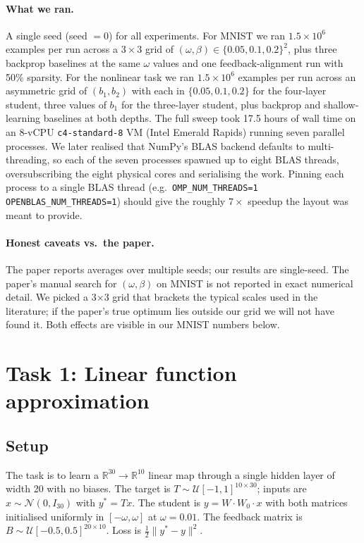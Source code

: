 \documentclass[11pt,a4paper]{article}
\begin{document}
\paragraph{What we ran.} A single seed (seed $=0$) for all experiments.
For MNIST we ran $1.5\times 10^6$ examples per run across a
$3\times 3$ grid of $(\omega,\beta) \in \{0.05, 0.1, 0.2\}^2$, plus three
backprop baselines at the same $\omega$ values and one feedback-alignment
run with 50\% sparsity. For the nonlinear task we ran $1.5\times 10^6$
examples per run across an asymmetric grid of $(b_1, b_2)$ with each in
$\{0.05, 0.1, 0.2\}$ for the four-layer student, three values of $b_1$ for
the three-layer student, plus backprop and shallow-learning baselines at
both depths. The full sweep took 17.5 hours of wall time on an 8-vCPU
\texttt{c4-standard-8} VM (Intel Emerald Rapids) running seven parallel
processes. We later realised that NumPy's BLAS backend defaults to
multi-threading, so each of the seven processes spawned up to eight BLAS
threads, oversubscribing the eight physical cores and serialising the work.
Pinning each process to a single BLAS thread (e.g.\
\texttt{OMP\_NUM\_THREADS=1 OPENBLAS\_NUM\_THREADS=1}) should give the
roughly $7\times$ speedup the layout was meant to provide.

\paragraph{Honest caveats vs.\ the paper.}
The paper reports averages over multiple seeds; our results are single-seed.
The paper's manual search for $(\omega, \beta)$ on MNIST is not reported in
exact numerical detail. We picked a 3$\times$3 grid that brackets the
typical scales used in the literature; if the paper's true optimum lies
outside our grid we will not have found it. Both effects are visible in our
MNIST numbers below.

\section{Task 1: Linear function approximation}

\subsection{Setup}

The task is to learn a $\mathbb{R}^{30} \to \mathbb{R}^{10}$ linear map
through a single hidden layer of width 20 with no biases. The target is
$T \sim \mathcal{U}[-1, 1]^{10\times 30}$; inputs are $x \sim \mathcal{N}(0, I_{30})$
with $y^* = T x$. The student is $y = W \cdot W_0 \cdot x$ with both
matrices initialised uniformly in $[-\omega, \omega]$ at $\omega = 0.01$.
The feedback matrix is $B \sim \mathcal{U}[-0.5, 0.5]^{20\times 10}$.
Loss is $\frac{1}{2}\|y^* - y\|^2$.
\end{document}
